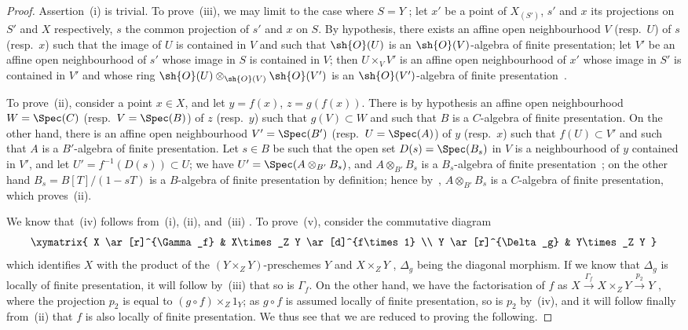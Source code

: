 \begin{proof}
Assertion~(i) is trivial.
To prove~(iii), we may limit to the case where $S=Y$ ; let $x'$ be a point of $X_{(S')}$, $s'$ and $x$ its projections on $S'$ and $X$ respectively, $s$ the common projection of $s'$ and $x$ on $S$.
By hypothesis, there exists an affine open neighbourhood $V$ (resp.~$U$) of $s$ (resp.~$x$) such that the image of $U$ is contained in $V$ and such that $\sh{O}(U)$ is an $\sh{O}(V)$-algebra of finite presentation; let $V'$ be an affine open neighbourhood of $s'$ whose image in $S$ is contained in $V$; then $U\times_V V'$ is an affine open neighbourhood of $x'$ whose image in $S'$ is contained in $V'$ and whose ring $\sh{O}(U)\otimes_{\sh{O}(V)}\sh{O}(V')$ is an $\sh{O}(V')$-algebra of finite presentation~.

To prove~(ii), consider a point $x\in X$, and let $y=f(x)$, $z=g(f(x))$.
There is by hypothesis an affine open neighbourhood $W=\Spec(C)$ (resp.~$V=\Spec(B)$) of $z$ (resp.~$y$) such that $g(V)\subset W$ and such that $B$ is a $C$-algebra of finite presentation.
On the other hand, there is an affine open neighbourhood $V'=\Spec(B')$ (resp.~$U=\Spec(A)$) of $y$ (resp.~$x$) such that $f(U)\subset V'$ and such that $A$ is a $B'$-algebra of finite presentation.
Let $s\in B$ be such that the open set $D(s)=\Spec(B_s)$ in $V$ is a neighbourhood of $y$ contained in $V'$, and let $U'=f^{-1}(D(s))\subset U$; we have $U'=\Spec(A\otimes_{B'}B_s)$, and $A\otimes_{B'}B_s$ is a $B_s$-algebra of finite presentation~; on the other hand $B_s=B[T]/(1-sT)$ is a $B$-algebra of finite presentation by definition; hence by~, $A\otimes_{B'}B_s$ is a $C$-algebra of finite presentation, which proves~(ii).

We know that~(iv) follows from~(i), (ii), and~(iii) .
To prove~(v), consider the commutative diagram
\[
\xymatrix{
  X \ar[r]^{\Gamma_f} & X\times_Z Y \ar[d]^{f\times 1} \\
  Y \ar[r]^{\Delta_g} & Y\times_Z Y
}
\]
which identifies $X$ with the product of the $(Y\times_Z Y)$-preschemes $Y$ and $X\times_Z Y$ , $\Delta_g$ being the diagonal morphism.
If we know that $\Delta_g$ is locally of finite presentation, it will follow by~(iii) that so is $\Gamma_f$.
On the other hand, we have the factorisation of $f$ as $X\xrightarrow{\Gamma_f} X\times_Z Y\xrightarrow{p_2} Y$ , where the projection $p_2$ is equal to $(g\circ f)\times_Z 1_Y$; as $g\circ f$ is assumed locally of finite presentation, so is $p_2$ by~(iv), and it will follow finally from~(ii) that $f$ is also locally of finite presentation.
We thus see that we are reduced to proving the following.
\end{proof}

